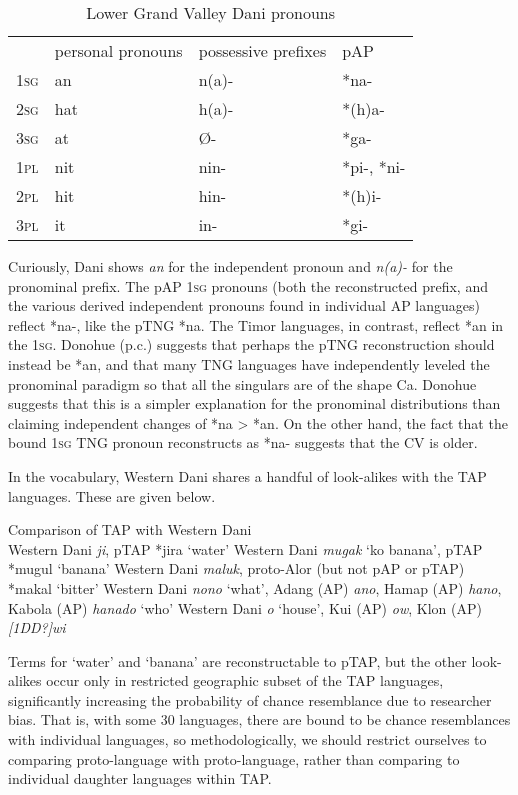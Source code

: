 \begin{table}\centering


\begin{tabular}{llll}
 & personal pronouns & possessive prefixes & pAP \\
\textsc{1sg}& an & n(a)- & *na- \\
\textsc{2sg}& hat & h(a)- & *(h)a- \\
\textsc{3sg}& at & {\O}- & *ga- \\
\textsc{1pl}& nit & nin- & *pi-, *ni- \\
\textsc{2pl}& hit & hin- & *(h)i- \\
\textsc{3pl}& it & in- & *gi- \\

\end{tabular}

\caption{Lower Grand Valley Dani pronouns \citep[145-6]{VanDerStap1966}}
\end{table}
Curiously, Dani shows \textit{an} for the independent pronoun and \textit{n(a)-} for the pronominal prefix. The pAP \textsc{1sg} pronouns (both the reconstructed prefix, and the various derived independent pronouns found in individual AP languages) reflect *na-, like the pTNG *na. The Timor languages, in contrast, reflect *an in the \textsc{1sg}. Donohue (p.c.) suggests that perhaps the pTNG reconstruction should instead be *an, and that many TNG languages have independently leveled the pronominal paradigm so that all the singulars are of the shape Ca. Donohue suggests that this is a simpler explanation for the pronominal distributions than claiming independent changes of *na {\textgreater} *an. On the other hand, the fact that the bound 1\textsc{sg TNG }pronoun reconstructs as *na- suggests that the CV is older.

In the vocabulary, Western Dani shares a handful of look-alikes with the TAP languages. These are given below.

\ea%
  Comparison of TAP with Western Dani \citep{PurbaEtAl1993} \\
  \ea Western Dani \textit{ji}, pTAP *jira `water'
  \ex Western Dani \textit{mugak} `ko banana', pTAP *mugul `banana'
  \ex Western Dani \textit{maluk}, proto-Alor (but not pAP or pTAP) *makal `bitter'
  \ex Western Dani \textit{nono} `what',  Adang (AP) \textit{ano}, Hamap (AP) \textit{hano}, Kabola (AP) \textit{hanado} `who'
  \ex Western Dani \textit{o} `house', Kui (AP) \textit{ow}, Klon (AP) \textit{[1DD?]}\textit{wi}
  \z
\z


Terms for `water' and `banana' are reconstructable to pTAP, but the other look-alikes occur only in restricted geographic subset of the TAP languages, significantly increasing the probability of chance resemblance due to researcher bias. That is, with some 30 languages, there are bound to be chance resemblances with individual languages, so methodologically, we should restrict ourselves to comparing proto-language with proto-language, rather than comparing to individual daughter languages within TAP.

